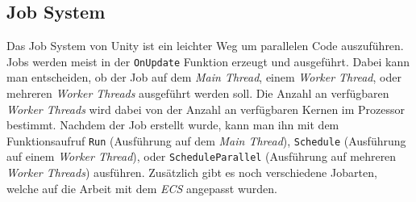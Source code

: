 \subsection{Job System} \label{jobs}
Das Job System von Unity ist ein leichter Weg um parallelen Code auszuführen. Jobs werden meist in der \texttt{OnUpdate} Funktion erzeugt und ausgeführt. Dabei kann man entscheiden, ob der Job auf dem \textit{Main Thread}, einem \textit{Worker Thread}, oder mehreren \textit{Worker Threads} ausgeführt werden soll. Die Anzahl an verfügbaren \textit{Worker Threads} wird dabei von der Anzahl an verfügbaren Kernen im Prozessor bestimmt. Nachdem der Job erstellt wurde, kann man ihn mit dem Funktionsaufruf \texttt{Run} (Ausführung auf dem \textit{Main Thread}), \texttt{Schedule} (Ausführung auf einem \textit{Worker Thread}), oder \texttt{ScheduleParallel} (Ausführung auf mehreren \textit{Worker Threads}) ausführen. Zusätzlich gibt es noch verschiedene Jobarten, welche auf die Arbeit mit dem \textit{ECS} angepasst wurden.
